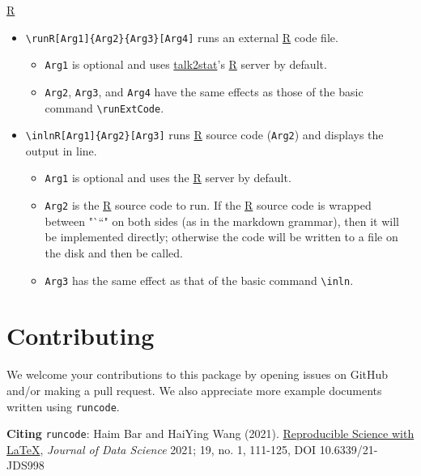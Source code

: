 \documentclass{ltxdoc}
\begin{document}
\href{https://www.r-project.org/}{R}

\begin{itemize}
\item \texttt{\textbackslash{}runR[Arg1]\{Arg2\}\{Arg3\}[Arg4]} runs an external
\href{https://www.r-project.org/}{R} code file.
\begin{itemize}
\item \texttt{Arg1} is optional and uses
\href{https://pypi.org/project/talk2stat/}{talk2stat}'s
\href{https://www.r-project.org/}{R} server by default.
\item \texttt{Arg2}, \texttt{Arg3}, and \texttt{Arg4} have the same effects as those of the
basic command \texttt{\textbackslash{}runExtCode}.
\end{itemize}
\item \texttt{\textbackslash{}inlnR[Arg1]\{Arg2\}[Arg3]} runs \href{https://www.r-project.org/}{R}
source code (\texttt{Arg2}) and displays the output in line.
\begin{itemize}
\item \texttt{Arg1} is optional and uses the \href{https://www.r-project.org/}{R}
server by default.
\item \texttt{Arg2} is the \href{https://www.r-project.org/}{R} source code to run.
If the \href{https://www.r-project.org/}{R} source code is wrapped
between "```" on both sides (as in the markdown grammar), then it
will be implemented directly; otherwise the code will be written to
a file on the disk and then be called.
\item \texttt{Arg3} has the same effect as that of the basic command \texttt{\textbackslash{}inln}.
\end{itemize}
\end{itemize}


\section{Contributing}
\label{sec:org42905dc}
We welcome your contributions to this package by opening issues on
GitHub and/or making a pull request. We also appreciate more example
documents written using \texttt{runcode}.


\textbf{Citing} \texttt{runcode}:
Haim Bar and HaiYing Wang (2021). \href{https://jds-online.org/journal/JDS/article/103/info}{Reproducible Science with \LaTeX{}},
\emph{Journal of Data Science} 2021; 19, no. 1, 111-125, DOI 10.6339/21-JDS998
\end{document}
